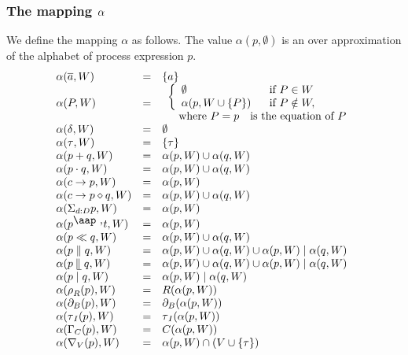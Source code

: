 \documentclass{article}
\begin{document}
\subsubsection{The mapping $\protect\alpha $}

We define the mapping $\alpha $ as follows. The value $\alpha (p,\emptyset )$
is an over approximation of the alphabet of process expression $p$.%
\[
\begin{array}{lll}
\alpha (\overline{a},W) & = & \{a\} \\ 
\alpha (P,W) & = & 
\begin{array}{l}
\left\{ 
\begin{array}{ll}
\emptyset  & \text{if }P\in W \\ 
\alpha (p,W\cup \{P\}) & \text{if }P\notin W,%
\end{array}%
\right.  \\ 
\text{ where }P=p\text{ is the equation of }P%
\end{array}
\\ 
\alpha (\delta ,W) & = & \emptyset  \\ 
\alpha (\tau ,W) & = & \{\tau \} \\ 
\alpha (p+q,W) & = & \alpha (p,W)\cup \alpha (q,W) \\ 
\alpha (p\cdot q,W) & = & \alpha (p,W)\cup \alpha (q,W) \\ 
\alpha (c\rightarrow p,W) & = & \alpha (p,W) \\ 
\alpha (c\rightarrow p\diamond q,W) & = & \alpha (p,W)\cup \alpha (q,W) \\ 
\alpha (\Sigma _{d:D}p,W) & = & \alpha (p,W) \\ 
\alpha (p^{\mathbin{\mbox{\aap
,}}}t,W) & = & \alpha (p,W) \\ 
\alpha (p\ll q,W) & = & \alpha (p,W)\cup \alpha (q,W) \\ 
\alpha (p\parallel q,W) & = & \alpha (p,W)\cup \alpha (q,W)\cup \alpha
(p,W)\mid \alpha (q,W) \\ 
\alpha (p\mathbin{\mathrel{\llfloor}}q,W) & = & \alpha (p,W)\cup \alpha
(q,W)\cup \alpha (p,W)\mid \alpha (q,W) \\ 
\alpha (p\mid q,W) & = & \alpha (p,W)\mid \alpha (q,W) \\ 
\alpha (\rho _{R}(p),W) & = & R(\alpha (p,W)) \\ 
\alpha (\partial _{B}(p),W) & = & \partial _{B}(\alpha (p,W)) \\ 
\alpha (\tau _{I}(p),W) & = & \tau _{I}(\alpha (p,W)) \\ 
\alpha (\Gamma _{C}(p),W) & = & C(\alpha (p,W)) \\ 
\alpha (\nabla _{V}(p),W) & = & \alpha (p,W)\cap (V\cup \{\tau \})%
\end{array}%
\]%
\end{document}

